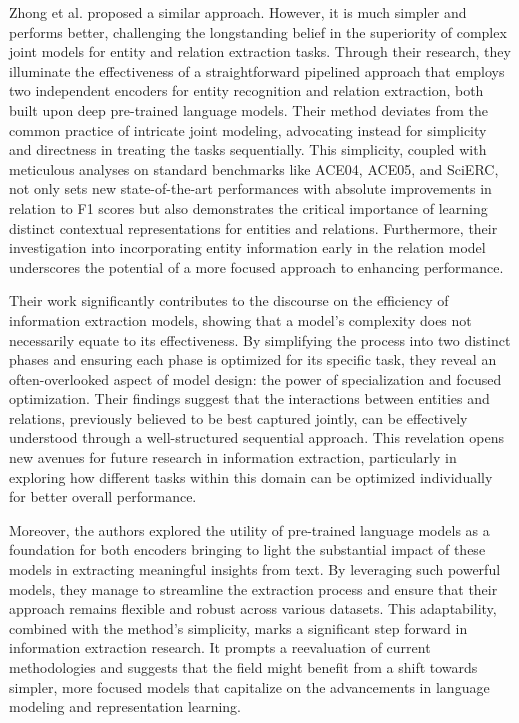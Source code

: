 Zhong et al. \cite{Zhong2020AFE} proposed a similar approach. However, it is much simpler and performs better, challenging the longstanding belief in the superiority of complex joint models for entity and relation extraction tasks. Through their research, they illuminate the effectiveness of a straightforward pipelined approach that employs two independent encoders for entity recognition and relation extraction, both built upon deep pre-trained language models. Their method deviates from the common practice of intricate joint modeling, advocating instead for simplicity and directness in treating the tasks sequentially. This simplicity, coupled with meticulous analyses on standard benchmarks like ACE04, ACE05, and SciERC, not only sets new state-of-the-art performances with absolute improvements in relation to F1 scores but also demonstrates the critical importance of learning distinct contextual representations for entities and relations. Furthermore, their investigation into incorporating entity information early in the relation model underscores the potential of a more focused approach to enhancing performance.

Their work significantly contributes to the discourse on the efficiency of information extraction models, showing that a model's complexity does not necessarily equate to its effectiveness. By simplifying the process into two distinct phases and ensuring each phase is optimized for its specific task, they reveal an often-overlooked aspect of model design: the power of specialization and focused optimization. Their findings suggest that the interactions between entities and relations, previously believed to be best captured jointly, can be effectively understood through a well-structured sequential approach. This revelation opens new avenues for future research in information extraction, particularly in exploring how different tasks within this domain can be optimized individually for better overall performance.

Moreover, the authors explored the utility of pre-trained language models as a foundation for both encoders bringing to light the substantial impact of these models in extracting meaningful insights from text. By leveraging such powerful models, they manage to streamline the extraction process and ensure that their approach remains flexible and robust across various datasets. This adaptability, combined with the method's simplicity, marks a significant step forward in information extraction research. It prompts a reevaluation of current methodologies and suggests that the field might benefit from a shift towards simpler, more focused models that capitalize on the advancements in language modeling and representation learning.